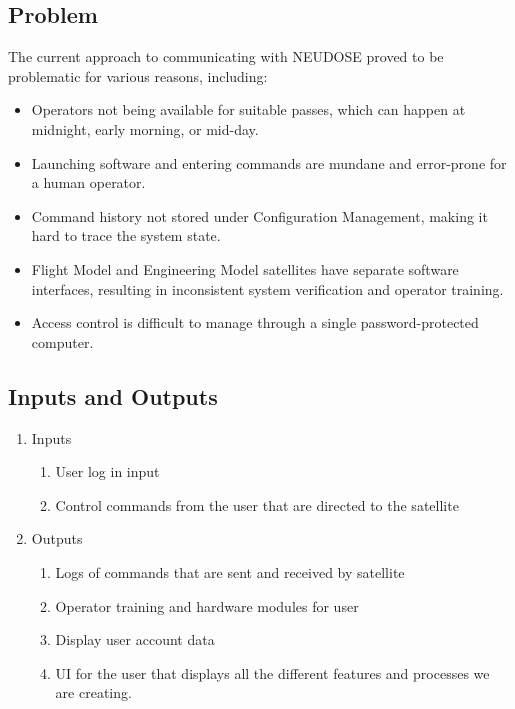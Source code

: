 \documentclass{article}
\begin{document}
\subsection{Problem}
The current approach to communicating with NEUDOSE proved to be problematic for various reasons, including:
\begin{itemize}
    \item Operators not being available for suitable passes, which can happen at midnight, early morning, or mid-day.
    \item Launching software and entering commands are mundane and error-prone for a human operator.
    \item Command history not stored under Configuration Management, making it hard to trace the system state.
    \item Flight Model and Engineering Model satellites have separate software interfaces, resulting in inconsistent system verification and operator training.
    \item Access control is difficult to manage through a single password-protected computer.
\end{itemize}



\subsection{Inputs and Outputs}
\begin{enumerate} 
    \item Inputs
    \begin{enumerate}
        \item User log in input 
        \item Control commands from the user that are directed to the satellite 
    \end{enumerate}

    \item Outputs
    \begin{enumerate}
        \item Logs of commands that are sent and received by satellite 
        \item Operator training and hardware modules for user
        \item Display user account data
        \item UI for the user that displays all the different features and processes we are creating. 
    \end{enumerate}
\end{enumerate}
\end{document}
